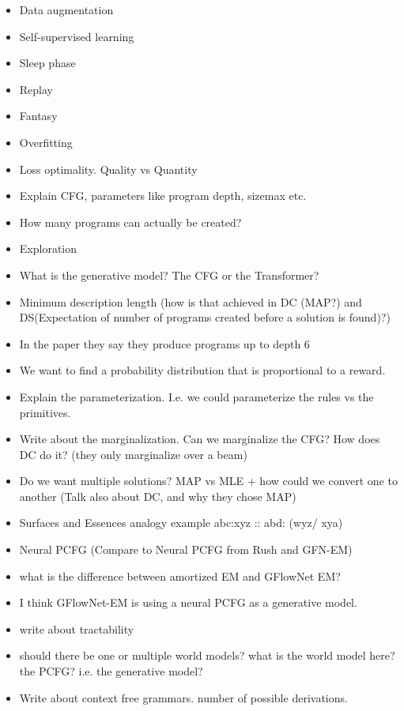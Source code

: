 \begin{itemize}
    \item Data augmentation
    \item Self-supervised learning
    \item Sleep phase
    \item Replay 
    \item Fantasy
    \item Overfitting
    \item Loss optimality. Quality vs Quantity
    \item Explain CFG, parameters like program depth, sizemax etc. 
    \item How many programs can actually be created?
    \item Exploration
    \item What is the generative model? The CFG or the Transformer?
    \item Minimum description length (how is that achieved in DC (MAP?) and DS(Expectation of number of programs created before a solution is found)?)
    \item In the paper they say they produce programs up to depth 6
    \item We want to find a probability distribution that is proportional to a reward.
    \item Explain the parameterization. I.e. we could parameterize the rules vs the primitives. 
    \item Write about the marginalization. Can we marginalize the CFG? How does DC do it? (they only marginalize over a beam) 
    \item Do we want multiple solutions? MAP vs MLE + how could we convert one to another (Talk also about DC, and why they chose MAP)
    \item Surfaces and Essences analogy example abc:xyz :: abd: (wyz/ xya) 
    \item Neural PCFG (Compare to Neural PCFG from Rush and GFN-EM)
    \item what is the difference between amortized EM and GFlowNet EM?
    \item I think GFlowNet-EM is using a neural PCFG as a generative model. 
    \item write about tractability
    \item should there be one or multiple world models?  what is the world model here? the PCFG? i.e. the generative model? 
    \item Write about context free grammars. number of possible derivations.

\end{itemize}
